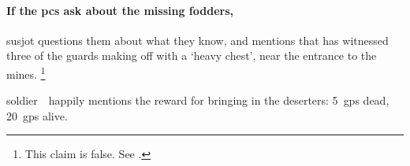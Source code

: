 \begin{multicols}{2}
\paragraph{If the \glspl{pc} ask about the missing \glspl{fodder},}
\gls{susjot} questions them about what they know, and mentions that  has witnessed three of the \glspl{guard} making off with a `heavy chest', near the entrance to the mines.%
\footnote{This claim is false.
See .}

\Gls{soldier}~\composeHumanName\ happily mentions the reward for bringing in the deserters: 5~\glspl{gp} dead, 20~\glspl{gp} alive.

\susjot

\stopcontents[segments]

\end{multicols}

